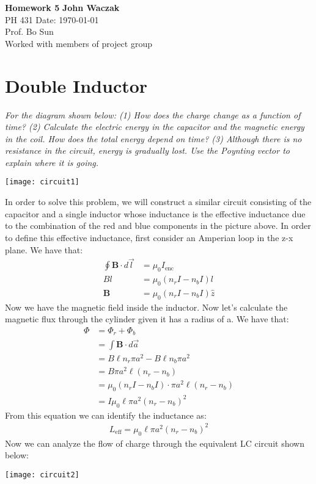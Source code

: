 \documentclass[a4paper, 11pt]{article}
\begin{document}
\noindent
\large\textbf{Homework 5} \hfill \textbf{John Waczak} \\
\normalsize PH 431 \hfill  Date: \today \\
Prof. Bo Sun  \\
Worked with members of project group \\ 

\section*{Double Inductor}
\textit{For the diagram shown below: (1) How does the charge change as a function of time? (2) Calculate the electric energy in the capacitor and the magnetic energy in the coil. How does the total energy depend on time? (3) Although there is no resistance in the circuit, energy is gradually lost. Use the Poynting vector to explain where it is going.} \\
		\begin{center}
			\texttt{[image: circuit1]}
		\end{center}

\noindent In order to solve this problem, we will construct a similar circuit consisting of the capacitor and a single inductor whose inductance is the effective inductance due to the combination of the red and blue components in the picture above. In order to define this effective inductance, first consider an Amperian loop in the z-x plane. We have that: 
	\begin{align*}
		\oint \mathbf{B} \cdot d\vec{l} &= \mu_0 I_{\text{enc}} \\ 
		B l &= \mu_0(n_rI - n_bI)l \\ 
		\mathbf{B} &= \mu_0(n_rI-n_bI) \hat{z} 
	\end{align*}
Now we have the magnetic field inside the inductor. Now let's calculate the magnetic flux through the cylinder given it has a radius of a. We have that: 
	\begin{align*}
		\Phi 	&= \Phi_r + \Phi_b\\ 
				&= \int \mathbf{B} \cdot d\vec{a}  \\ 
				&= B\ell n_r\pi a^2 - B \ell n_b\pi a^2 \\ 
				&= B\pi a^2 \ell(n_r-n_b) \\ 
				&= \mu_0(n_rI-n_bI) \cdot \pi a^2\ell(n_r-n_b) \\ 
				&= I \mu_0 \ell \pi a^2 (n_r - n_b)^2 
	\end{align*}
From this equation we can identify the inductance as: 
	\begin{eqnarray}
		L_{\text{eff}} = \mu_0 \ell \pi a^2 (n_r - n_b)^2
	\end{eqnarray}
Now we can analyze the flow of charge through the equivalent LC circuit shown below: 
	\begin{center}
		\texttt{[image: circuit2]}
	\end{center}
\end{document}

